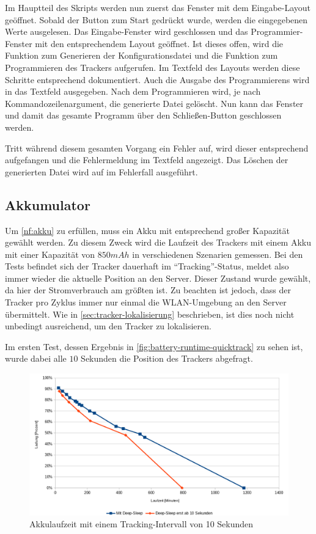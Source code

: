 Im Hauptteil des Skripts werden nun zuerst das Fenster mit dem Eingabe-Layout geöffnet.
Sobald der Button zum Start gedrückt wurde, werden die eingegebenen Werte ausgelesen.
Das Eingabe-Fenster wird geschlossen und das Programmier-Fenster mit den entsprechendem Layout geöffnet.
Ist dieses offen, wird die Funktion zum Generieren der Konfigurationsdatei und die Funktion zum Programmieren des Trackers aufgerufen.
Im Textfeld des Layouts werden diese Schritte entsprechend dokumentiert.
Auch die Ausgabe des Programmierens wird in das Textfeld ausgegeben.
Nach dem Programmieren wird, je nach Kommandozeilenargument, die generierte Datei gelöscht.
Nun kann das Fenster und damit das gesamte Programm über den Schließen-Button geschlossen werden.

Tritt während diesem gesamten Vorgang ein Fehler auf, wird dieser entsprechend aufgefangen und die Fehlermeldung im Textfeld angezeigt.
Das Löschen der generierten Datei wird auf im Fehlerfall ausgeführt.

\subsection{Akkumulator}

Um \ref*{nf:akku} zu erfüllen, muss ein \gls{Akku} mit entsprechend großer Kapazität gewählt werden.
Zu diesem Zweck wird die Laufzeit des Trackers mit einem \gls{Akku} mit einer Kapazität von $850
mAh$ in verschiedenen Szenarien gemessen. Bei den Tests befindet sich der Tracker dauerhaft im
\enquote{Tracking}-Status, meldet also immer wieder die aktuelle Position an den Server. Dieser
Zustand wurde gewählt, da hier der Stromverbrauch am größten ist. Zu beachten ist jedoch, dass der
Tracker pro Zyklus immer nur einmal die \gls{WLAN}-Umgebung an den Server übermittelt. Wie in
\autoref{sec:tracker-lokalisierung} beschrieben, ist dies noch nicht unbedingt ausreichend, um den
Tracker zu lokalisieren.

Im ersten Test, dessen Ergebnis in
\autoref{fig:battery-runtime-quicktrack} zu sehen ist, wurde dabei alle $10$ Sekunden die Position
des Trackers abgefragt.

\begin{figure}[htbp]
	\centering
	\includegraphics[width=.9\textwidth]{images/battery-runtime-quicktrack.png}
	\caption{Akkulaufzeit mit einem Tracking-Intervall von 10 Sekunden}
	\label{fig:battery-runtime-quicktrack}
\end{figure}

